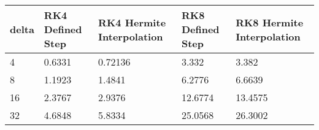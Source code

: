 \begin{tabular}{lllll}
delta & RK4 Defined Step & RK4 Hermite Interpolation & RK8 Defined Step & RK8 Hermite Interpolation \\ 
\hline 
4 & 0.6331 & 0.72136 & 3.332 & 3.382 \\ 
8 & 1.1923 & 1.4841 & 6.2776 & 6.6639 \\ 
16 & 2.3767 & 2.9376 & 12.6774 & 13.4575 \\ 
32 & 4.6848 & 5.8334 & 25.0568 & 26.3002 \\ 
\hline 
\end{tabular}